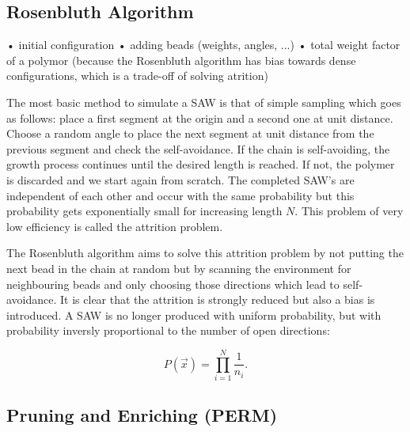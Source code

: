 \subsection*{Rosenbluth Algorithm}
		• initial configuration
		• adding beads (weights, angles, ...)
		• total weight factor of a polymor (because the Rosenbluth algorithm has bias towards dense configurations, which is a trade-off of solving atrition)

The most basic method to simulate a SAW is that of simple sampling which goes as follows: place a first segment at the origin and a second one at unit distance. Choose a random angle to place the next segment at unit distance from the previous segment and check the self-avoidance. If the chain is self-avoiding, the growth process continues until the desired length is reached. If not, the polymer is discarded and we start again from scratch. The completed SAW's are independent of each other and occur with the same probability but this probability gets exponentially small for increasing length $N$. This problem of very low efficiency is called the attrition problem.

The Rosenbluth algorithm aims to solve this attrition problem by not putting the next bead in the chain at random but by scanning the environment for neighbouring beads and only choosing those directions which lead to self-avoidance. It is clear that the attrition is strongly reduced but also a bias is introduced. A SAW is no longer produced with uniform probability, but with probability inversly proportional to the number of open directions:

\begin{equation}
	P\left(\vec{x}\right) = \prod_{i=1}^{N} \frac{1}{n_i} .
\end{equation}


\subsection*{Pruning and Enriching (PERM)}